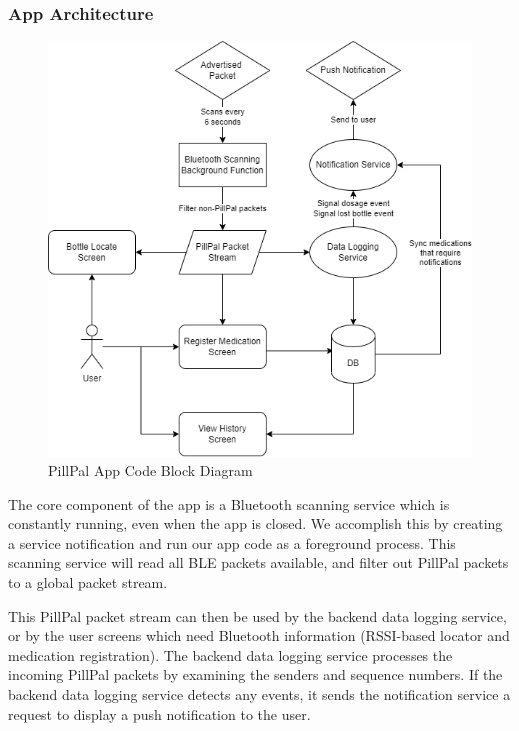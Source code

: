 \documentclass[sigconf]{acmart}
\begin{document}
\subsubsection{App Architecture}
\label{sec:software_arch}
\begin{figure}[h]
  \centering
  \includegraphics[width=\linewidth]{images/app_block.png}
  \caption{PillPal App Code Block Diagram}
  \label{fig:sw_block}
\end{figure}

The core component of the app is a Bluetooth scanning service which is constantly running, even when the app is closed. We accomplish this by creating a service notification and run our app code as a foreground process. This scanning service will read all BLE packets available, and filter out PillPal packets to a global packet stream.

This PillPal packet stream can then be used by the backend data logging service, or by the user screens which need Bluetooth information (RSSI-based locator and medication registration). The backend data logging service processes the incoming PillPal packets by examining the senders and sequence numbers. If the backend data logging service detects any events, it sends the notification service a request to display a push notification to the user.
\end{document}
